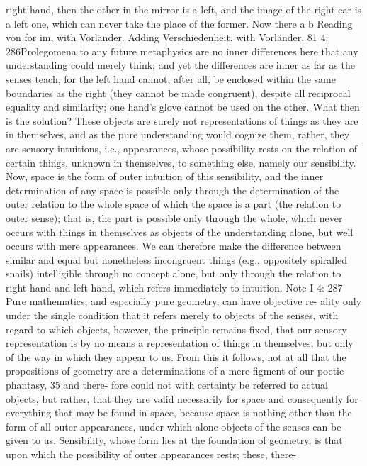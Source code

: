 right hand, then the other in the mirror is a left, and the image of the right
ear is a left one, which can never take the place of the former. Now there
a
b
Reading von for im, with Vorländer.
Adding Verschiedenheit, with Vorländer.
81
4: 286Prolegomena to any future metaphysics
are no inner differences here that any understanding could merely think;
and yet the differences are inner as far as the senses teach, for the left hand
cannot, after all, be enclosed within the same boundaries as the right (they
cannot be made congruent), despite all reciprocal equality and similarity;
one hand’s glove cannot be used on the other. What then is the solution?
These objects are surely not representations of things as they are in
themselves, and as the pure understanding would cognize them, rather,
they are sensory intuitions, i.e., appearances, whose possibility rests on
the relation of certain things, unknown in themselves, to something
else, namely our sensibility. Now, space is the form of outer intuition
of this sensibility, and the inner determination of any space is possible
only through the determination of the outer relation to the whole space
of which the space is a part (the relation to outer sense); that is, the
part is possible only through the whole, which never occurs with things
in themselves as objects of the understanding alone, but well occurs
with mere appearances. We can therefore make the difference between
similar and equal but nonetheless incongruent things (e.g., oppositely
spiralled snails) intelligible through no concept alone, but only through
the relation to right-hand and left-hand, which refers immediately to
intuition.
Note I
4: 287
Pure mathematics, and especially pure geometry, can have objective re-
ality only under the single condition that it refers merely to objects of
the senses, with regard to which objects, however, the principle remains
ﬁxed, that our sensory representation is by no means a representation
of things in themselves, but only of the way in which they appear to us.
From this it follows, not at all that the propositions of geometry are a
determinations of a mere ﬁgment of our poetic phantasy, 35 and there-
fore could not with certainty be referred to actual objects, but rather,
that they are valid necessarily for space and consequently for everything
that may be found in space, because space is nothing other than the form
of all outer appearances, under which alone objects of the senses can be
given to us. Sensibility, whose form lies at the foundation of geometry, is
that upon which the possibility of outer appearances rests; these, there-
